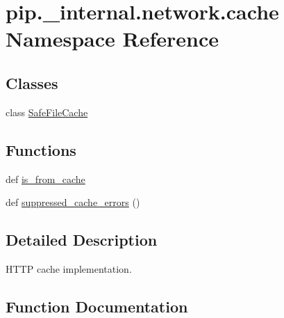 \hypertarget{namespacepip_1_1__internal_1_1network_1_1cache}{}\section{pip.\+\_\+internal.\+network.\+cache Namespace Reference}
\label{namespacepip_1_1__internal_1_1network_1_1cache}
\subsection*{Classes}
\begin{DoxyCompactItemize}
\item 
class \hyperlink{classpip_1_1__internal_1_1network_1_1cache_1_1SafeFileCache}{Safe\+File\+Cache}
\end{DoxyCompactItemize}
\subsection*{Functions}
\begin{DoxyCompactItemize}
\item 
def \hyperlink{namespacepip_1_1__internal_1_1network_1_1cache_a874bc20bdb8680fa1f9f51960c59ccc5}{is\+\_\+from\+\_\+cache}
\item 
def \hyperlink{namespacepip_1_1__internal_1_1network_1_1cache_a9f176df75f4d12bd9d53d7bb66ea610d}{suppressed\+\_\+cache\+\_\+errors} ()
\end{DoxyCompactItemize}


\subsection{Detailed Description}
\begin{DoxyVerb}HTTP cache implementation.
\end{DoxyVerb}
 

\subsection{Function Documentation}
\mbox{\label{namespacepip_1_1__internal_1_1network_1_1cache_a874bc20bdb8680fa1f9f51960c59ccc5}} 

